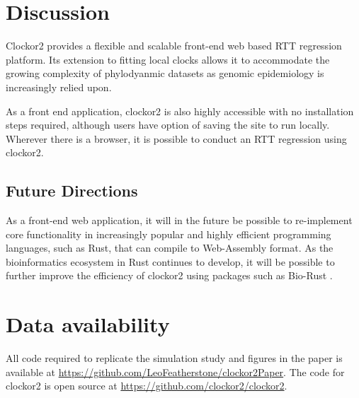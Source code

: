 \documentclass{article}
\begin{document}
\section*{Discussion}
Clockor2 provides a flexible and scalable front-end web based RTT regression platform. Its extension to fitting local clocks allows it to accommodate the growing complexity of phylodyanmic datasets as genomic epidemiology is increasingly relied upon. 

As a front end application, clockor2 is also highly accessible with no installation steps required, although users have option of saving the site to run locally. Wherever there is a browser, it is possible to conduct an RTT regression using clockor2. 

\subsection*{Future Directions}
As a front-end web application, it will in the future be possible to re-implement core functionality in increasingly popular and highly efficient programming languages, such as Rust, that can compile to Web-Assembly format. As the bioinformatics ecosystem in Rust continues to develop, it will be possible to further improve the efficiency of clockor2 using packages such as Bio-Rust \citep{koester_rust-bio-2015}.


\section*{Data availability}
All code required to replicate the simulation study and figures in the paper is available at \url{https://github.com/LeoFeatherstone/clockor2Paper}. The code for clockor2 is open source at \url{https://github.com/clockor2/clockor2}.


\end{document}
